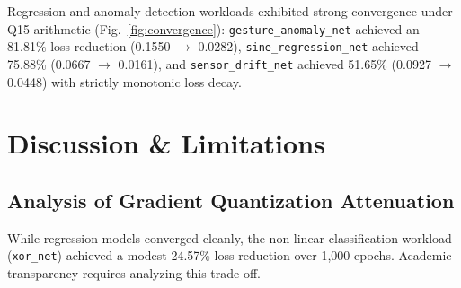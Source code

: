 \documentclass[conference]{IEEEtran}
\begin{document}
\begin{table}[t]
\centering
\caption{Numerical Convergence and Loss Reduction under Q15 Math}
\label{tab:convergence}
\end{table}

Regression and anomaly detection workloads exhibited strong convergence under Q15 arithmetic (Fig.~\ref{fig:convergence}): \texttt{gesture\_anomaly\_net} achieved an 81.81\% loss reduction (0.1550 $\to$ 0.0282), \texttt{sine\_regression\_net} achieved 75.88\% (0.0667 $\to$ 0.0161), and \texttt{sensor\_drift\_net} achieved 51.65\% (0.0927 $\to$ 0.0448) with strictly monotonic loss decay.

\section{Discussion \& Limitations}

\subsection{Analysis of Gradient Quantization Attenuation}
While regression models converged cleanly, the non-linear classification workload (\texttt{xor\_net}) achieved a modest 24.57\% loss reduction over 1,000 epochs. Academic transparency requires analyzing this trade-off.
\end{document}
